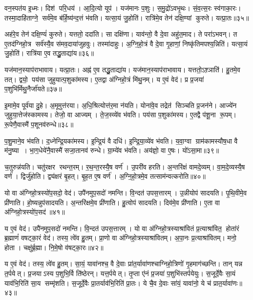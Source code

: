 वन॒स्पत॑य इ॒ध्मः।
दिश॑ परि॒धय॑।
आ॒दि॒त्यो यूप॑।
यज॑मानः प॒शुः।
स॒मु॒द्रो॑ऽवभृ॒थः।
सं॒व॒त्स॒रः स्व॑गाका॒रः।
तस्मा॒दाहि॑ताग्ने॒ सर्व॑मे॒व ब॑र्हि॒ष्य॑न्द॒त्तं भ॑वति।
यत्सा॒यं जु॒होति॑।
रात्रि॑मे॒व तेन॑ दक्षि॒ण्यां कुरुते।
यत्प्रा॒तः॥३५॥

अह॑रे॒व तेन॑ दक्षि॒ण्यं॑ कुरुते।
यत्ततो॒ ददा॑ति।
सा दक्षि॑णा।
याव॑न्तो॒ वै दे॒वा अहु॑त॒माद\sn{}।
ते परा॑ऽभवन्।
त ए॒तद॑ग्निहो॒त्र सर्व॑स्यै॒व स॑मव॒दाया॑जुहवुः।
तस्मा॑दाहुः।
अ॒ग्नि॒हो॒त्रं वै दे॒वा गृ॒हाणां॒ निष्कृ॑तिमपश्य॒न्निति॑।
यत्सा॒यं जु॒होति॑।
रात्रि॑या ए॒व तद्धु॒ताद्या॑य॥३६॥

यज॑मान॒स्याप॑राभावाय।
यत्प्रा॒तः।
अह्न॑ ए॒व तद्धु॒ताद्या॑य।
यज॑मान॒स्याप॑राभावाय।
यत्ततो॒ऽश़्ञाति॑।
हु॒तमे॒व तत्।
द्वयो॒ पय॑सा जुहुयात्प॒शुका॑मस्य।
ए॒तद्वा अ॑ग्निहो॒त्रं मि॑थु॒नम्।
य ए॒वं वेद॑।
प्र प्र॒जया॑ प॒शुभि॑र्मिथु॒नैर्जा॑यते॥३७॥

इ॒मामे॒व पूर्व॑या दु॒हे।
अ॒मूमुत्त॑रया।
अ॒धि॒श्रित्योत्त॑र॒मा न॑यति।
योना॑वे॒व तद्रेत॑ सिञ्चति प्र॒जन॑ने।
आज्ये॑न जुहुया॒त्तेज॑स्कामस्य।
तेजो॒ वा आज्यम्।
ते॒ज॒स्व्ये॑व भ॑वति।
पय॑सा प॒शुका॑मस्य।
ए॒तद्वै प॑शू॒ना रू॒पम्।
रू॒पेणै॒वास्मै॑ प॒शूनव॑रुन्धे॥३८॥

प॒शु॒माने॒व भ॑वति।
द॒ध्नेन्द्रि॒यका॑मस्य।
इ॒न्द्रि॒यं वै दधि॑।
इ॒न्द्रि॒या॒व्ये॑व भ॑वति।
य॒वा॒ग्वा ग्राम॑कामस्यौष॒धा वै म॑नु॒ष्या।
भा॒ग॒धेये॑नै॒वास्मै॑ सजा॒तानव॑ रुन्धे।
ग्रा॒म्ये॑व भ॑वति।
अय॑ज्ञो॒ वा ए॒षः।
यो॑ऽसा॒मा॥३९॥

च॒तुरुन्न॑यति।
चतु॑रक्षर रथन्त॒रम्।
र॒थ॒न्त॒रस्यै॒ष वर्ण॑।
उ॒परी॑व हरति।
अ॒न्तरि॑क्षं वामदे॒व्यम्।
वा॒म॒दे॒व्यस्यै॒ष वर्ण॑।
द्विर्जु॑होति।
द्व्य॑क्षरं बृ॒हत्।
बृ॒ह॒त ए॒ष वर्ण॑।
अ॒ग्नि॒हो॒त्रमे॒व तत्साम॑न्वत्करोति॥४०॥

यो वा अ॑ग्निहो॒त्रस्यो॑प॒सदो॒ वेद॑।
उपै॑नमुप॒सदो॑ नमन्ति।
वि॒न्दत॑ उपस॒त्तारम्।
उ॒न्नीयोप॑ सादयति।
पृ॒थि॒वीमे॒व प्री॑णाति।
हो॒ष्यन्नुप॑सादयति।
अ॒न्तरि॑क्षमे॒व प्री॑णाति।
हु॒त्वोप॑ सादयति।
दिव॑मे॒व प्री॑णाति।
ए॒ता वा अ॑ग्निहो॒त्रस्यो॑प॒सद॑॥४१॥

य ए॒वं वेद॑।
उपै॑नमुप॒सदो॑ नमन्ति।
वि॒न्दत॑ उपस॒त्तारम्।
यो वा अ॑ग्निहो॒त्रस्याश्रा॑वितं प्र॒त्याश्रा॑वित॒ होता॑रं ब्र॒ह्माणं॑ वषट्का॒रं वेद॑।
तस्य॒ त्वे॑व हु॒तम्।
प्रा॒णो वा अ॑ग्निहो॒त्रस्याश्रा॑वितम्।
अ॒पा॒नः प्र॒त्याश्रा॑वितम्।
मनो॒ होता।
चक्षु॑र्ब्र॒ह्मा।
नि॒मे॒षो व॑षट्का॒रः॥४२॥

य ए॒वं वेद॑।
तस्य॒ त्वे॑व हु॒तम्।
सा॒यं॒ यावा॑नश्च॒ वै दे॒वाः प्रा॑त॒र्यावा॑णश्चाग्निहो॒त्रिणो॑ गृ॒हमाग॑च्छन्ति।
तान् यन्न त॒र्पयेत्।
प्र॒जयाऽस्य प॒शुभि॒र्वि ति॑ष्ठेरन्।
यत्त॒र्पयेत्।
तृ॒प्ता ए॑नं प्र॒जया॑ प॒शुभि॑स्तर्पयेयुः।
स॒जूर्दे॒वैः सा॒यं याव॑भि॒रिति॑ सा॒य सम्मृ॑शति।
स॒जूर्दे॒वैः प्रा॒तर्याव॑भि॒रिति॑ प्रा॒तः।
ये चै॒व दे॒वाः सा॑यं॒ यावा॑नो॒ ये च॑ प्रात॒र्यावा॑णः॥४३॥

